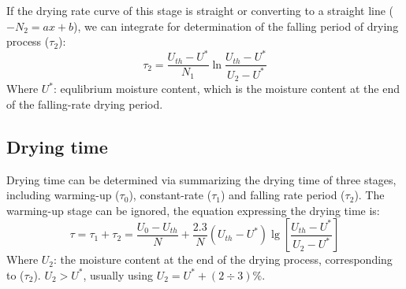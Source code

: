 If the drying rate curve of this stage is straight or converting to a straight line ($-N_2 = ax + b$), we can integrate for determination of the falling period of drying process ($\tau_2$):
\begin{equation}
    \tau_2 = \frac{U_{th} - U^*}{N_1} \ln \frac{U_{th} - U^*}{U_2 - U^*}
\end{equation}
Where $U^*$: equlibrium moisture content, which is the moisture content at the end of the falling-rate drying period.

\subsection{Drying time}
Drying time can be determined via summarizing the drying time of three stages, including warming-up ($\tau_0$), constant-rate ($\tau_1$) and falling rate period ($\tau_2$). The warming-up stage can be ignored, the equation expressing the drying time is:
\begin{equation}
    \tau = \tau_1 + \tau_2 = \frac{U_0 - U_{th}}{N} + \frac{2.3}{N} (U_{th} - U^*) \lg \left[ \frac{U_{th} - U^*}{U_2 - U^*} \right]
\end{equation}
Where $U_2$: the moisture content at the end of the drying process, corresponding to ($\tau_2$). $U_2 > U^*$, usually using $U_2 = U^* + (2 \div 3)\%$.
